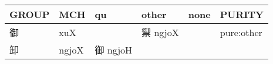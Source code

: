 \documentclass[14pt,a4paper]{scrartcl}
\begin{document}
\begin{longtable}[c]{@{}llllll@{}}
\toprule
\begin{minipage}[b]{0.14\columnwidth}\raggedright\strut
GROUP
\strut\end{minipage} &
\begin{minipage}[b]{0.14\columnwidth}\raggedright\strut
MCH
\strut\end{minipage} &
\begin{minipage}[b]{0.14\columnwidth}\raggedright\strut
qu
\strut\end{minipage} &
\begin{minipage}[b]{0.14\columnwidth}\raggedright\strut
other
\strut\end{minipage} &
\begin{minipage}[b]{0.14\columnwidth}\raggedright\strut
none
\strut\end{minipage} &
\begin{minipage}[b]{0.14\columnwidth}\raggedright\strut
PURITY
\strut\end{minipage}\tabularnewline
\midrule
\endhead
\begin{minipage}[t]{0.14\columnwidth}\raggedright\strut
御
\strut\end{minipage} &
\begin{minipage}[t]{0.14\columnwidth}\raggedright\strut
xuX
\strut\end{minipage} &
\begin{minipage}[t]{0.14\columnwidth}\raggedright\strut
\strut\end{minipage} &
\begin{minipage}[t]{0.14\columnwidth}\raggedright\strut
禦 ngjoX
\strut\end{minipage} &
\begin{minipage}[t]{0.14\columnwidth}\raggedright\strut
\strut\end{minipage} &
\begin{minipage}[t]{0.14\columnwidth}\raggedright\strut
pure:other
\strut\end{minipage}\tabularnewline
\begin{minipage}[t]{0.14\columnwidth}\raggedright\strut
卸
\strut\end{minipage} &
\begin{minipage}[t]{0.14\columnwidth}\raggedright\strut
ngjoX
\strut\end{minipage} &
\begin{minipage}[t]{0.14\columnwidth}\raggedright\strut
御 ngjoH
\strut\end{minipage} &
\begin{minipage}[t]{0.14\columnwidth}\raggedright\strut

\end{minipage}
\end{longtable}
\end{document}
